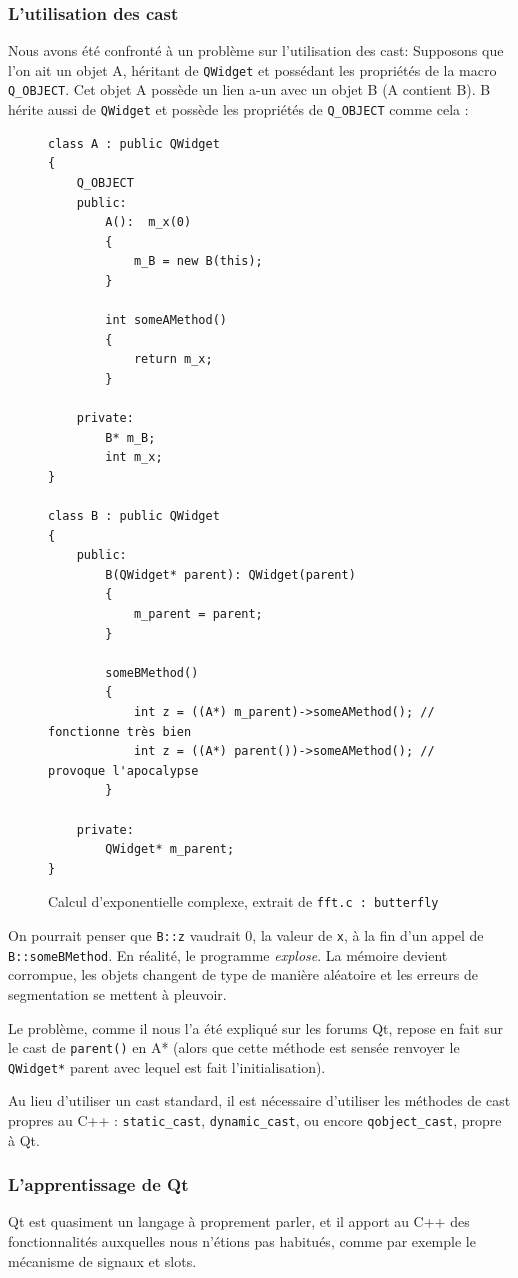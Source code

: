 \subsubsection{L'utilisation des cast}
Nous avons été confronté à un problème sur l'utilisation des cast:
Supposons que l'on ait un objet A, héritant de \texttt{QWidget} et possédant les propriétés de la macro \texttt{Q\_OBJECT}.
Cet objet A possède un lien a-un avec un objet B (A contient B).
B hérite aussi de \texttt{QWidget} et possède les propriétés de \texttt{Q\_OBJECT} comme cela :
\begin{figure}[H]
\begin{lstlisting}
class A : public QWidget
{
	Q_OBJECT
	public:
		A():  m_x(0)
		{
			m_B = new B(this);
		}

		int someAMethod()
		{
			return m_x;
		}

	private:
		B* m_B;
		int m_x;
}

class B : public QWidget
{
	public:
		B(QWidget* parent): QWidget(parent)
		{
			m_parent = parent;
		}

		someBMethod()
		{
			int z = ((A*) m_parent)->someAMethod(); // fonctionne très bien
			int z = ((A*) parent())->someAMethod(); // provoque l'apocalypse
		}

	private:
		QWidget* m_parent;
}
\end{lstlisting}
\caption{Calcul d'exponentielle complexe, extrait de \texttt{fft.c : butterfly}}
\label{api_cexp_computation}
\end{figure}

On pourrait penser que \texttt{B::z} vaudrait $0$, la valeur de \texttt{x}, à la fin d'un appel de \texttt{B::someBMethod}.
En réalité, le programme \textit{explose}. La mémoire devient corrompue, les objets
changent de type de manière aléatoire et les erreurs de segmentation se mettent à pleuvoir.

Le problème, comme il nous l'a été expliqué sur les forums Qt, repose en fait sur le cast de \texttt{parent()}
en A* (alors que cette méthode est sensée renvoyer le \texttt{QWidget*} parent avec lequel est fait l'initialisation).

Au lieu d'utiliser un cast standard, il est nécessaire d'utiliser les méthodes de cast propres au C++ :
\texttt{static\_cast}, \texttt{dynamic\_cast}, ou encore \texttt{qobject\_cast}, propre à Qt.

\subsubsection{L'apprentissage de Qt}
Qt est quasiment un langage à proprement parler, et il apport au C++ des fonctionnalités auxquelles nous n'étions pas habitués,
comme par exemple le mécanisme de signaux et slots.

